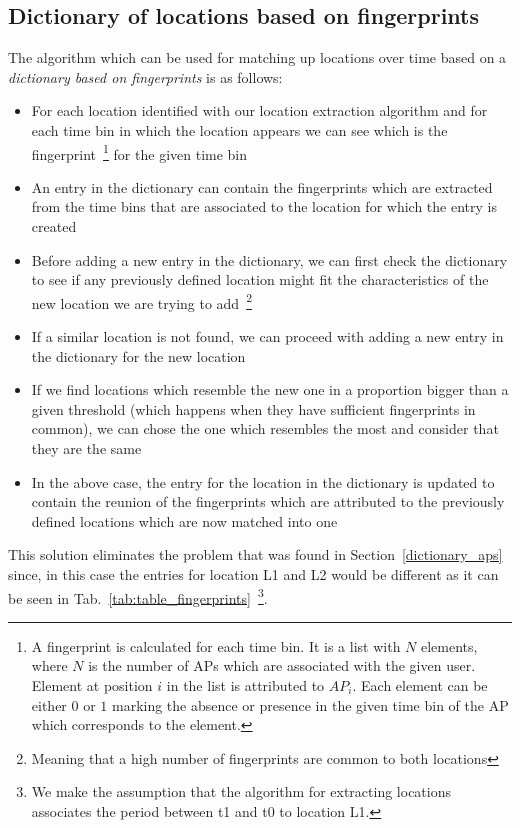 \subsection{Dictionary of locations based on fingerprints}
\label{dictionary_fingerprints}
The algorithm which can be used for matching up locations over time based on a
\textit{dictionary based on fingerprints} is as follows:
\begin{itemize}
  \item For each location identified with our location extraction algorithm and
  for each time bin in which the location appears we can see which is the
  fingerprint~\footnote{A fingerprint is calculated for each time bin. It is a
  list with $N$ elements, where $N$ is the number of APs which are associated
  with the given user. Element at position $i$ in the list is attributed to $AP_{i}$.
  Each element can be either $0$ or $1$ marking the absence or presence in the
  given time bin of the AP which corresponds to the element.} for the given time bin 
  \item An entry in the dictionary can contain the fingerprints which are
  extracted from the time bins that are associated to the location for which
  the entry is created
  \item Before adding a new entry in the dictionary, we can first
  check the dictionary to see if any previously defined location might fit the
  characteristics of the new location we are trying to add~\footnote{Meaning
  that a high number of fingerprints are common to both locations}
  \item If a similar location is not found, we can proceed with adding a new
  entry in the dictionary for the new location
  \item If we find locations which resemble the new one in a proportion bigger
  than a given threshold (which happens when they have sufficient fingerprints
  in common), we can chose the one which resembles the most and consider that
  they are the same
  \item In the above case, the entry for the location in the dictionary
  is updated to contain the reunion of the fingerprints which are attributed
  to the previously defined locations which are now matched into one
\end{itemize}

This solution eliminates the problem that was found in
Section~\ref{dictionary_aps} since, in this case the entries for location L1 and
L2 would be different as it can be seen in
Tab.~\ref{tab:table_fingerprints}~\footnote{We make the assumption that the
algorithm for extracting locations associates the period between t1 and t0 to
location L1.}.

